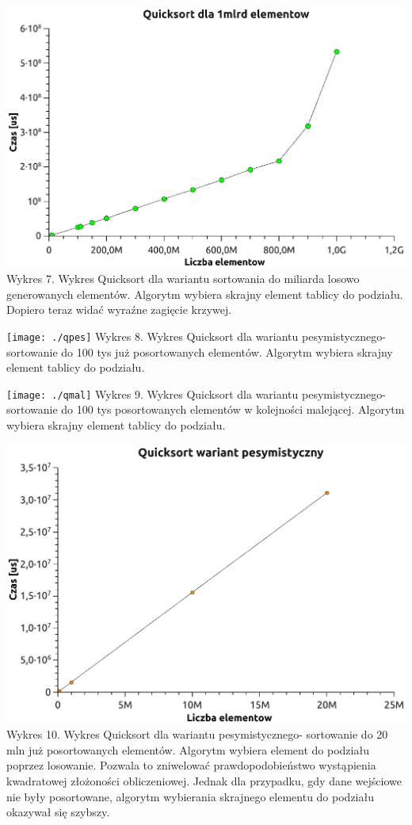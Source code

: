 \documentclass[12pt,a4paper]{article}
\begin{document}
\includegraphics[scale=0.4]{./qmld} \newline
Wykres 7. Wykres Quicksort dla wariantu sortowania do miliarda losowo generowanych elementów. Algorytm wybiera skrajny element tablicy do podziału. Dopiero teraz widać wyraźne zagięcie
krzywej. \newpage

\texttt{[image: ./qpes]} \newline
Wykres 8. Wykres Quicksort dla wariantu pesymistycznego- sortowanie do 100 tys już posortowanych elementów. Algorytm wybiera skrajny element tablicy do podziału. \newpage

\texttt{[image: ./qmal]} \newline
Wykres 9. Wykres Quicksort dla wariantu pesymistycznego- sortowanie do 100 tys posortowanych elementów w kolejności malejącej. Algorytm wybiera skrajny element tablicy do podziału. \newpage

\includegraphics[scale=0.6]{./qpn} \newline
Wykres 10. Wykres Quicksort dla wariantu pesymistycznego- sortowanie do 20 mln już posortowanych elementów. Algorytm wybiera element do podziału poprzez losowanie. Pozwala to zniwelować prawdopodobieństwo wystąpienia kwadratowej złożoności obliczeniowej. Jednak dla przypadku, gdy dane wejściowe nie były posortowane, algorytm wybierania skrajnego elementu do podziału okazywał się szybszy.
\end{document}
